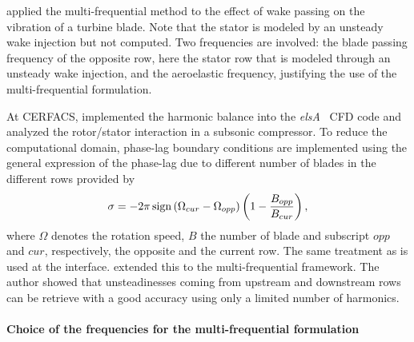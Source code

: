 \citet{Ekici2008a} applied the multi-frequential method
to the effect of wake passing on the vibration of
a turbine blade. Note that the stator is modeled
by an unsteady wake injection but not computed.
Two frequencies are involved: the blade passing
frequency of the opposite row, here the
stator row that is modeled through an unsteady wake injection,
and the aeroelastic frequency, justifying the use
of the multi-frequential formulation.


At CERFACS, \citet{JSicot2012} implemented the harmonic balance 
into the \textit{elsA}~\cite{Cambier2013} CFD code
and analyzed the rotor/stator interaction in a subsonic
compressor. To reduce the computational domain, 
phase-lag boundary conditions are implemented
using the general expression of the phase-lag due to
different number of blades in the different rows 
provided by \citet{Gerolymos1991}
\begin{equation}
 	\sigma = - 2 \pi \operatorname{sign} \left(\Omega_{cur} - \Omega_{opp} \right) 
 	\left(1 - \frac{B_{opp}}{B_{cur}}\right),
\end{equation} 
where $\Omega$ denotes the rotation speed, $B$ the number
of blade and subscript $opp$ and $cur$, respectively, the
opposite and the current row. The same treatment as \citet{Gopinath2007}
is used at the interface.
\citet{ThesisGuedeney} extended this to the multi-frequential framework.
The author showed that unsteadinesses coming from upstream and downstream
rows can be retrieve with a good accuracy using only a limited 
number of harmonics. 

\paragraph{Choice of the frequencies for the multi-frequential formulation}
\label{par:choice_of_frequencies}

